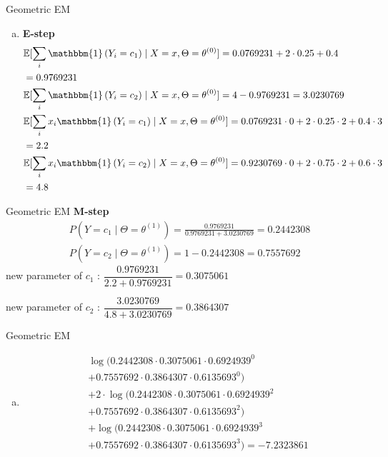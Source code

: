 \documentclass{beamer}\usepackage[]{graphicx}\usepackage[]{color}
\newcommand{\id}[1]{\mathbbm{1}\left(#1\right)}
\begin{document}
\begin{frame}{Geometric EM}
\small
\begin{enumerate}[c)]
\item \textbf{E-step}\begin{align*}
&\mathbb{E}[\sum_{i}\id{Y_{i}=c_{1}}\mid X=x, \Theta=\theta^{(0)}] = 0.0769231 + 
2\cdot 0.25 + 0.4 \\
&= 0.9769231 \\
&\mathbb{E}[\sum_{i}\id{Y_{i}=c_{2}}\mid X=x, \Theta=\theta^{(0)}] = 4 - 0.9769231 = 3.0230769 \\
&\mathbb{E}[\sum_{i}x_{i}\id{Y_{i}=c_{1}}\mid X=x, \Theta=\theta^{(0)}] = 0.0769231 \cdot 0 + 
2\cdot 0.25 \cdot 2 + 0.4 \cdot 3\\
&= 2.2 \\
&\mathbb{E}[\sum_{i}x_{i}\id{Y_{i}=c_{2}}\mid X=x, \Theta=\theta^{(0)}] = 0.9230769 \cdot 0 + 
2\cdot 0.75 \cdot 2 + 0.6 \cdot 3\\
&= 4.8
\end{align*}
\end{enumerate}
\end{frame}



\begin{frame}{Geometric EM}
\textbf{M-step}
\begin{align*}
&P(Y=c_{1}\mid \Theta = \theta^{(1)}) = \frac{0.9769231}{0.9769231 + 3.0230769} = 0.2442308 \\
&P(Y=c_{2}\mid \Theta = \theta^{(1)}) = 1 - 0.2442308
= 0.7557692 
\end{align*}
new parameter of $ c_{1} $ : $ \dfrac{0.9769231}{2.2 + 0.9769231} = 0.3075061 $\vspace{.5cm}

new parameter of $ c_{2} $ : $ \dfrac{3.0230769}{4.8 + 3.0230769} = 0.3864307 $
\end{frame}

\begin{frame}{Geometric EM}
\begin{enumerate}[d)]
\item \begin{align*}
&\log(0.2442308\cdot 0.3075061\cdot 0.6924939^{0}  \\
&+ 0.7557692 \cdot 0.3864307 \cdot 0.6135693^{0}) \\
&+ 2\cdot \log(0.2442308\cdot 0.3075061 \cdot 0.6924939^{2} \\
&+ 0.7557692\cdot 0.3864307 \cdot 0.6135693^{2}) \\
&+ \log(0.2442308\cdot 0.3075061 \cdot 0.6924939^{3} \\
&+ 0.7557692\cdot 0.3864307 \cdot 0.6135693^{3})
= \ensuremath{-7.2323861} 
\end{align*}
\end{enumerate}
\end{frame}
\end{document}
